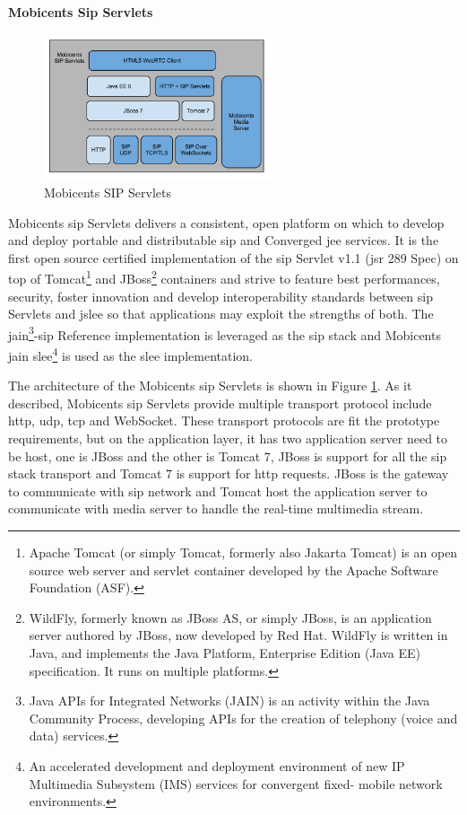 \textbf{Mobicents Sip Servlets}

\begin{figure}
	\centering
    	\includegraphics[width=0.60\textwidth,natwidth=610,natheight=642]{figs/mobicents.png}
  	\caption{Mobicents SIP Servlets\cite{code:mobicents}}
  	\label{fig:mobicents}
\end{figure}

\par Mobicents \gls{sip} Servlets delivers a consistent, open platform on which to develop and deploy portable and distributable \gls{sip} and Converged \gls{jee} services.  It is the first open source certified implementation of the \gls{sip} Servlet v1.1 (\gls{jsr} 289 Spec) on top of Tomcat\footnote{Apache Tomcat (or simply Tomcat, formerly also Jakarta Tomcat) is an open source web server and servlet container developed by the Apache Software Foundation (ASF).\cite{wiki:tomcat}} and JBoss\footnote{WildFly, formerly known as JBoss AS, or simply JBoss, is an application server authored by JBoss, now developed by Red Hat. WildFly is written in Java, and implements the Java Platform, Enterprise Edition (Java EE) specification. It runs on multiple platforms.\cite{wiki:jboss}} containers and strive to feature best performances, security, foster innovation and develop interoperability standards between \gls{sip} Servlets and \gls{jslee} so that applications may exploit the strengths of both. The \gls{jain}\footnote{Java APIs for Integrated Networks (JAIN) is an activity within the Java Community Process, developing APIs for the creation of telephony (voice and data) services.\cite{wiki:jain}}-\gls{sip} Reference implementation is leveraged as the \gls{sip} stack and Mobicents \gls{jain} \gls{slee}\footnote{An accelerated development and deployment environment of new IP Multimedia Subsystem (IMS) services for convergent fixed- mobile network environments.\cite{website:slee}} is used as the \gls{slee} implementation.

\par The architecture of the Mobicents \gls{sip} Servlets is shown in Figure \ref{fig:mobicents}. As it described, Mobicents \gls{sip} Servlets provide multiple transport protocol include \gls{http}, \gls{udp}, \gls{tcp} and WebSocket. These transport protocols are fit the prototype requirements, but on the application layer, it has two application server need to be host, one is JBoss and the other is Tomcat 7, JBoss is support for all the \gls{sip} stack transport and Tomcat 7 is support for \gls{http} requests. JBoss is the gateway to communicate with \gls{sip} network and Tomcat host the application server to communicate with media server to handle the real-time multimedia stream.

